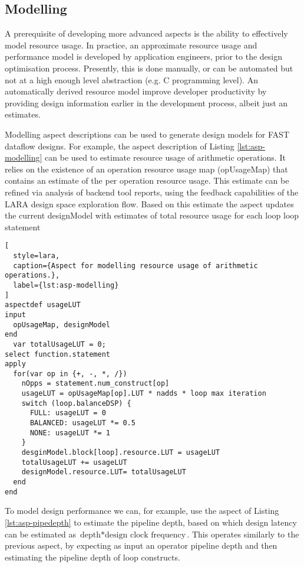 \subsection{Modelling}

A prerequisite of developing more advanced aspects is the ability to
effectively model resource usage. In practice, an approximate resource
usage and performance model is developed by application engineers,
prior to the design optimisation process. Presently, this is done
manually, or can be automated but not at a high enough level
abstraction (e.g. C programming level). An automatically derived
resource model improve developer productivity by providing design
information earlier in the development process, albeit just an
estimates.

Modelling aspect descriptions can be used to generate design models
for FAST dataflow designs.  For example, the aspect description of
Listing \ref{lst:asp-modelling} can be used to estimate resource usage
of arithmetic operations. It relies on the existence of an operation
resource usage map (opUsageMap) that contains an estimate of the per
operation resource usage. This estimate can be refined via analysis of
backend tool reports, using the feedback capabilities of the LARA
design space exploration flow. Based on this estimate the aspect
updates the current designModel with estimates of total resource usage
for each loop loop statement

\begin{lstlisting}[
  style=lara,
  caption={Aspect for modelling resource usage of arithmetic operations.},
  label={lst:asp-modelling}
]
aspectdef usageLUT
input
  opUsageMap, designModel
end
  var totalUsageLUT = 0;
select function.statement
apply
  for(var op in {+, -, *, /})
    nOpps = statement.num_construct[op]
    usageLUT = opUsageMap[op].LUT * nadds * loop max iteration
    switch (loop.balanceDSP) {
      FULL: usageLUT = 0
      BALANCED: usageLUT *= 0.5
      NONE: usageLUT *= 1
    }
    desginModel.block[loop].resource.LUT = usageLUT
    totalUsageLUT += usageLUT
    designModel.resource.LUT= totalUsageLUT
  end
end
\end{lstlisting}


To model design performance we can, for example, use the aspect of
Listing \ref{lst:asp-pipedepth} to estimate the pipeline depth, based
on which design latency can be estimated as $\text{depth} *
\text{design clock frequency}$. This operates similarly to the
previous aspect, by expecting as input an operator pipeline depth and
then estimating the pipeline depth of loop constructs.

